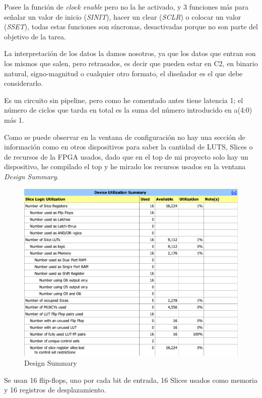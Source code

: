 \documentclass[11pt,a4paper]{article}
\begin{document}
\begin{itemize}
    Posee la función de \textit{clock enable} pero no la he activado, y 3 funciones más para señalar un valor de inicio (\textit{SINIT}), hacer un clear (\textit{SCLR}) o colocar un valor (\textit{SSET}), todas estas funciones son síncronas, desactivadas porque no son parte del objetivo de la tarea.
    
    La interpretación de los datos la damos nosotros, ya que los datos que entran son los mismos que salen, pero retrasados, es decir que pueden estar en C2, en binario natural, signo-magnitud o cualquier otro formato, el diseñador es el que debe considerarlo.
    
    Es un circuito sin pipeline, pero como he comentado antes tiene latencia 1; el número de ciclos que tarda en total es la suma del número introducido en a(4:0) más 1. 
    
    Como se puede observar en la ventana de configuración no hay una sección de información como en otros dispositivos para saber la cantidad de LUTS, Slices o de recursos de la FPGA usados, dado que en el top de mi proyecto solo hay un dispositivo, he compilado el top y he mirado los recursos usados en la ventana \textit{Design Summary}.
    
    \begin{figure}[H]
        \centering
        \includegraphics[scale=0.5]{images/information.pdf}
        \caption{Design Summary}
    \end{figure}
    
    Se usan 16 flip-flops, uno por cada bit de entrada, 16 Slices usados como memoria y 16 registros de desplazamiento.
    

\end{itemize}
\end{document}
